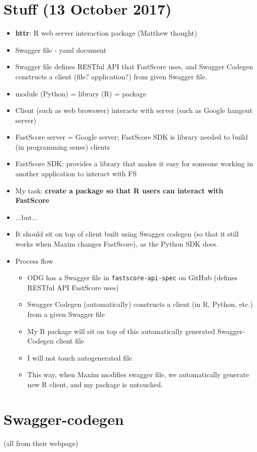 \documentclass{article}
\begin{document}
\section*{Stuff (13 October 2017)}
\begin{itemize}
\item {\bf httr}: R web server interaction package (Matthew thought)
\item Swagger file - yaml document
\item Swagger file defines RESTful API that FastScore uses, and Swagger Codegen constructs a client (file? application?) from given Swagger file.
\item module (Python) = library (R) = package
\item Client (such as web browswer) interacts with server (such as Google hangout server)
\item FastScore server = Google server; FastScore SDK is library needed to build (in programming sense) clients
\item FastScore SDK: provides a library that makes it easy for someone working in another application to interact with FS
\item My task: {\bf create a package so that R users can interact with FastScore}
\item ...but...
\item It should sit on top of client built using Swagger codegen (so that it still works when Maxim changes FastScore), as the Python SDK does.
\item Process flow
  \begin{itemize}
  \item ODG has a Swagger file in \verb|fastscore-api-spec| on GitHub (defines RESTful API FastScore uses)
  \item Swagger Codegen (automatically) constructs a client (in R, Python, etc.) from a given Swagger file 
  \item My R package will sit on top of this automatically generated Swagger-Codegen client file
  \item I will not touch autogenerated file
  \item This way, when Maxim modifies swagger file, we automatically generate new R client, and my package is untouched.
  \end{itemize}
\end{itemize}

\section*{Swagger-codegen}
(all from their webpage)
\end{document}
